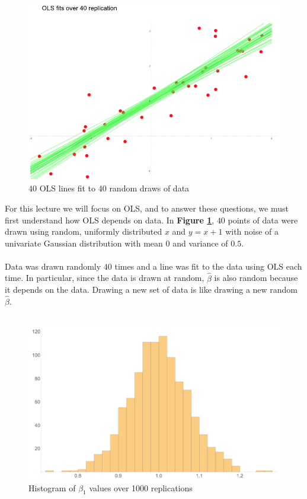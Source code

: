\documentclass[a4paper]{article}
\begin{document}
\bigskip
\begin{figure}
	\centering
	\includegraphics[width=\linewidth]{40_OLS.png}
	\caption{$40$ OLS lines fit to $40$ random draws of data}
    \label{OLS_lines}
\end{figure}
For this lecture we will focus on OLS, and to answer these questions, we must first understand how OLS depends on data. In \textbf{Figure \ref{OLS_lines}}, $40$ points of data were drawn using random, uniformly distributed $x$ and $y=x+1$ with noise of a univariate Gaussian distribution with mean $0$ and variance of $0.5$. \\ \\
Data was drawn randomly $40$ times and a line was fit to the data using OLS each time. In particular, since the data is drawn at random, $\hat{\beta}$ is also random because it depends on the data. Drawing a new set of data is like drawing a new random $\hat{\beta}$.\\ \\
\begin{figure}
	\centering
	\includegraphics[width=\linewidth]{beta_hist.png}
	\caption{Histogram of $\beta_1$ values over 1000 replications}
    \label{beta_hist}
\end{figure}
\end{document}
